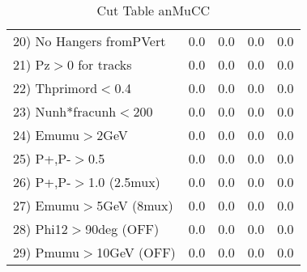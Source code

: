\begin{table}[h!]
\begin{tabular}{||l||r|r|r|r||}
 20) No Hangers fromPVert &         0.0 &         0.0 &         0.0 &         0.0 \\
 21) Pz$>$0 for tracks    &         0.0 &         0.0 &         0.0 &         0.0 \\
 22) Thprimord$<$0.4      &         0.0 &         0.0 &         0.0 &         0.0 \\
 23) Nunh*fracunh$<$200   &         0.0 &         0.0 &         0.0 &         0.0 \\
 24) Emumu$>$2GeV         &         0.0 &         0.0 &         0.0 &         0.0 \\
 25) P+,P-$>$0.5          &         0.0 &         0.0 &         0.0 &         0.0 \\
 26) P+,P-$>$1.0 (2.5mux) &         0.0 &         0.0 &         0.0 &         0.0 \\
 27) Emumu$>$5GeV  (8mux) &         0.0 &         0.0 &         0.0 &         0.0 \\
 28) Phi12$>$90deg  (OFF) &         0.0 &         0.0 &         0.0 &         0.0 \\
 29) Pmumu$>$10GeV  (OFF) &         0.0 &         0.0 &         0.0 &         0.0 \\
 \hline
 \hline
 \end{tabular}
 \caption{Cut Table  anMuCC }
 \label{tab-cut_anmcc}
 \end{table}
